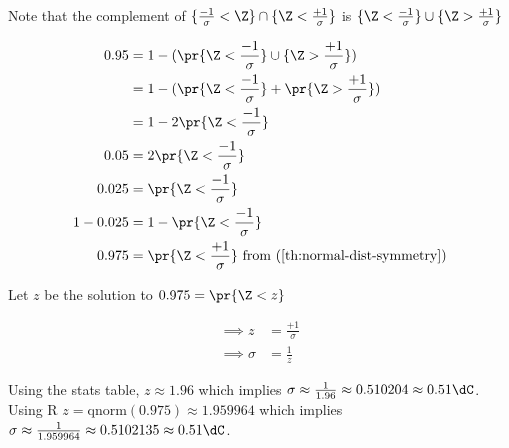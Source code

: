 Note that the complement of $\{ \frac{-1}{\sigma} < \Z \} \cap \{\Z < \frac{+1}{\sigma} \}$ is
$\{ \Z < \frac{-1}{\sigma} \} \cup \{ \Z > \frac{+1}{\sigma} \}$

\begin{align*}
0.95 &= 1 - (\pr{\Z < \frac{-1}{\sigma} \} \cup \{ \Z > \frac{+1}{\sigma}}) \\
&= 1 - (\pr{\Z < \frac{-1}{\sigma}} + \pr{\Z > \frac{+1}{\sigma}}) \\
&= 1 - 2\pr{\Z < \frac{-1}{\sigma}} \\
0.05 &= 2\pr{\Z < \frac{-1}{\sigma}} \\
0.025 &= \pr{\Z < \frac{-1}{\sigma}} \\
1 - 0.025 &= 1- \pr{\Z < \frac{-1}{\sigma}} \\
0.975 &= \pr{\Z < \frac{+1}{\sigma}}
\text{	from (\ref{th:normal-dist-symmetry})}
\\
\end{align*}

Let $z$ be the solution to $0.975 = \pr{\Z < z}$

\begin{align*}
\implies z &= \frac{+1}{\sigma} \\
\implies \sigma &= \frac{1}{z}
\end{align*}

Using the stats table, $z \approx 1.96$ which implies $\sigma \approx \frac{1}{1.96} \approx 0.510204 \approx 0.51\dC$.
Using R $z = \text{qnorm}(0.975) \approx 1.959964$ which implies $\sigma \approx \frac{1}{1.959964} \approx 0.5102135 \approx 0.51\dC$.
